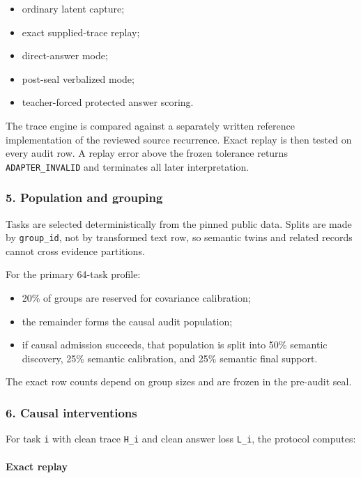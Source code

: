 \documentclass[
  10pt,
]{article}
\providecommand{\tightlist}{%
  \setlength{\itemsep}{0pt}\setlength{\parskip}{0pt}}
\begin{document}
\begin{itemize}
\tightlist
\item
  ordinary latent capture;
\item
  exact supplied-trace replay;
\item
  direct-answer mode;
\item
  post-seal verbalized mode;
\item
  teacher-forced protected answer scoring.
\end{itemize}

The trace engine is compared against a separately written reference
implementation of the reviewed source recurrence. Exact replay is then
tested on every audit row. A replay error above the frozen tolerance
returns \texttt{ADAPTER\_INVALID} and terminates all later
interpretation.

\subsubsection{5. Population and
grouping}\label{population-and-grouping}

Tasks are selected deterministically from the pinned public data. Splits
are made by \texttt{group\_id}, not by transformed text row, so semantic
twins and related records cannot cross evidence partitions.

For the primary 64-task profile:

\begin{itemize}
\tightlist
\item
  20\% of groups are reserved for covariance calibration;
\item
  the remainder forms the causal audit population;
\item
  if causal admission succeeds, that population is split into 50\%
  semantic discovery, 25\% semantic calibration, and 25\% semantic final
  support.
\end{itemize}

The exact row counts depend on group sizes and are frozen in the
pre-audit seal.

\subsubsection{6. Causal interventions}\label{causal-interventions}

For task \texttt{i} with clean trace \texttt{H\_i} and clean answer loss
\texttt{L\_i}, the protocol computes:

\paragraph{Exact replay}\label{exact-replay}
\end{document}
